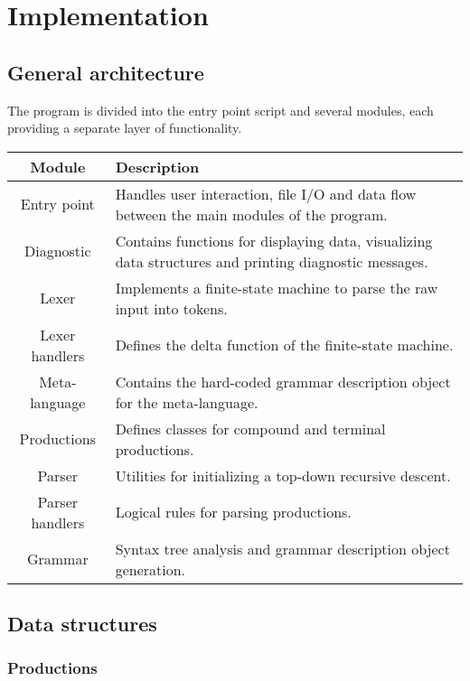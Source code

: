 \documentclass{article}
\begin{document}
	\section{Implementation}

	\subsection{General architecture}

	The program is divided into the entry point script and several modules,
	each providing a separate layer of functionality.

	\begin{center}
	\begin{tabular}{ |c|p{8.5cm}| }
		\hline
			Module & Description \\
		\hline
			Entry point & Handles user interaction, file I/O and data flow between the main modules of the program. \\
		\hline
			Diagnostic & Contains functions for displaying data, visualizing data structures and printing diagnostic messages. \\
		\hline
			Lexer & Implements a finite-state machine to parse the raw input into tokens. \\
		\hline
			Lexer handlers & Defines the delta function of the finite-state machine. \\
		\hline
			Meta-language & Contains the hard-coded grammar description object for the meta-language. \\
		\hline
			Productions & Defines classes for compound and terminal productions. \\
		\hline
			Parser & Utilities for initializing a top-down recursive descent. \\
		\hline
			Parser handlers & Logical rules for parsing productions. \\
		\hline
			Grammar & Syntax tree analysis and grammar description object generation. \\
		\hline
	\end{tabular}
	\end{center}

	\subsection{Data structures}

	\subsubsection{Productions}
\end{document}
